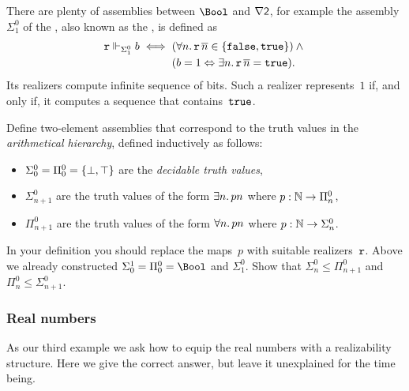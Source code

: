 There are plenty of assemblies between $\Bool$ and $\nabla \two$, for example the assembly $\Sigma^0_1$ of the , also known as the , is defined as
%
\begin{equation*}
  \R{r} \rz[\Sigma^0_1] b
  \iff
  \begin{aligned}[t]
  & (\all{n} \R{r}\,\overline{n} \in \set{\combFalse, \combTrue})
  \land {} \\
  & (b = 1 \liff \some{n} \R{r}\,\overline{n} = \combTrue).
  \end{aligned}
\end{equation*}
%
Its realizers compute infinite sequence of bits. Such a realizer represents~$1$ if, and only if, it computes a sequence that contains~$\combTrue$.

\begin{exercise}
  Define two-element assemblies that correspond to the truth values in the \emph{arithmetical hierarchy}, defined inductively as follows:
  \begin{itemize}
  \item $\Sigma^0_0 = \Pi^0_0 = \set{\bot, \top}$ are the \emph{decidable truth values},
  \item $\Sigma^0_{n+1}$ are the truth values of the form $\some{n} p n$ where $p : \NN \to \Pi^0_n$,
  \item $\Pi^0_{n+1}$ are the truth values of the form $\all{n} p n$ where $p : \NN \to \Sigma^0_n$.
  \end{itemize}
  In your definition you should replace the maps~$p$ with suitable realizers~$\R{r}$.
  Above we already constructed $\Sigma_0^1 = \Pi^0_0 = \Bool$ and $\Sigma^0_1$. Show that $\Sigma^0_n \leq \Pi^0_{n+1}$ and $\Pi^0_n \leq \Sigma^0_{n+1}$.
\end{exercise}


\subsubsection{Real numbers}
\label{sec:asm-real-numbers}

As our third example we ask how to equip the real numbers with a realizability structure. Here we give the correct answer, but leave it unexplained for the time being.

